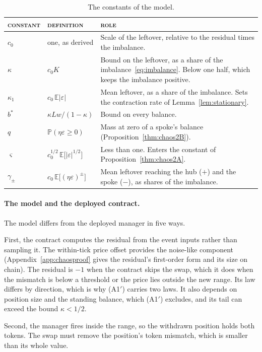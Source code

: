 \documentclass[11pt,a4paper]{article}
\DeclareRobustCommand{\thd}[1]{{\scshape\addfontfeatures{LetterSpace=1.5}\MakeLowercase{#1}}}
\theoremstyle{siphon}
\begin{document}
\begin{table}[!htb]
\centering
\caption{The constants of the model.}
\label{tab:constants}
\begin{tabular}{@{}llp{8.2cm}@{}}
\toprule
\thd{Constant} & \thd{Definition} & \thd{Role}  \\
\midrule
$c_0$ & one, as derived & Scale of the leftover, relative to the residual times the imbalance. \\
$\kappa$ & $c_0 K$ & Bound on the leftover, as a share of the imbalance~\eqref{eq:imbalance}. Below one half, which keeps the imbalance positive. \\
$\kappa_1$ & $c_0\,\mathbb{E}|\varepsilon|$ & Mean leftover, as a share of the imbalance. Sets the contraction rate of Lemma~\ref{lem:stationary}. \\
$b^*$ & $\kappa Lw/(1 - \kappa)$ & Bound on every balance. \\
$q$ & $\mathbb{P}(\eta \varepsilon \geq 0)$ & Mass at zero of a spoke's balance (Proposition~\ref{thm:chaos2B}). \\
$\varsigma$ & $c_0^{1/2}\,\mathbb{E}\bigl[|\varepsilon|^{1/2}\bigr]$ & Less than one. Enters the constant of Proposition~\ref{thm:chaos2A}. \\
$\gamma_\pm$ & $c_0\,\mathbb{E}\bigl[(\eta\varepsilon)^\pm\bigr]$ & Mean leftover reaching the hub ($+$) and the spoke ($-$), as shares of the imbalance. \\
\bottomrule
\end{tabular}
\end{table}

\paragraph{The model and the deployed contract.}
The model differs from the deployed manager in five ways.

First, the contract computes the residual from the event inputs rather than sampling it. The within-tick price offset provides the noise-like component (Appendix~\ref{app:chaosproof} gives the residual's first-order form and its size on chain). The residual is $-1$ when the contract skips the swap, which it does when the mismatch is below a threshold or the price lies outside the new range. Its law differs by direction, which is why (A1$'$) carries two laws. It also depends on position size and the standing balance, which (A1$'$) excludes, and its tail can exceed the bound $\kappa < 1/2$.

Second, the manager fires inside the range, so the withdrawn position holds both tokens. The swap must remove the position's token mismatch, which is smaller than its whole value.
\end{document}
